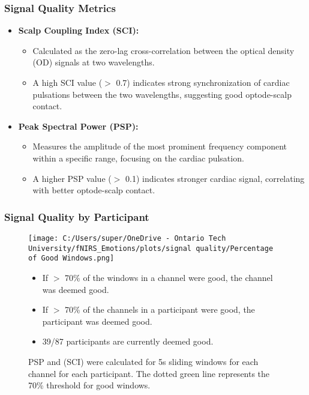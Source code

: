 \documentclass{beamer}
\begin{document}
\begin{frame}
    \frametitle{Signal Quality Metrics}
    \begin{itemize}
        \item \textbf{Scalp Coupling Index (SCI):}
        \begin{itemize}
            \item Calculated as the zero-lag cross-correlation between the optical density (OD) signals at two wavelengths. 
            \item A high SCI value ($>$ 0.7) indicates strong synchronization of cardiac pulsations between the two wavelengths, suggesting good optode-scalp contact.
        \end{itemize}
        \item \textbf{Peak Spectral Power (PSP):}
        \begin{itemize}
            \item Measures the amplitude of the most prominent frequency component within a specific range, focusing on the cardiac pulsation.
            \item A higher PSP value ($>$ 0.1) indicates stronger cardiac signal, correlating with better optode-scalp contact.
        \end{itemize}
    \end{itemize}
\end{frame}

\begin{frame}
    \frametitle{Signal Quality by Participant}
    \begin{figure}
        \texttt{[image: C:/Users/super/OneDrive - Ontario Tech University/fNIRS\_Emotions/plots/signal quality/Percentage of Good Windows.png]}
        \caption{PSP and (SCI) were calculated for 5s sliding windows for each channel for each participant.
        The dotted green line represents the 70\% threshold for good windows.
        }
            \begin{itemize}
                \item If $>$ 70\% of the windows in a channel were good, the channel was deemed good.
                \item If $>$ 70\% of the channels in a participant were good, the participant was deemed good.
                \item 39/87 participants are currently deemed good.
            \end{itemize}
    \end{figure}
\end{frame}
\end{document}
